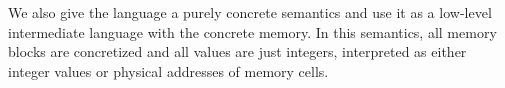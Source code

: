 We also give the language a purely concrete semantics and use it as a
low-level intermediate language with the concrete memory.  In this
semantics, all memory blocks are concretized and all values are just
integers, interpreted as either integer values or physical addresses
of memory cells.



